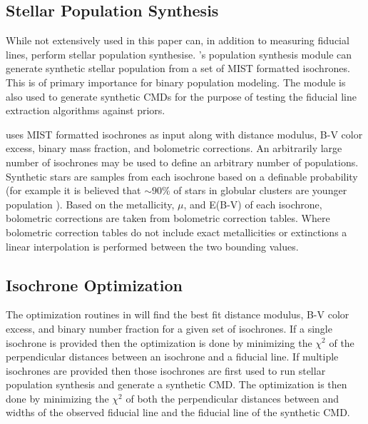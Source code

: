 \subsection{Stellar Population Synthesis}
While not extensively used in this paper \fidanka can, in addition to measuring fiducial
lines, perform stellar population synthesise. \fidanka's population synthesis
module can generate synthetic stellar population from a set of MIST formatted
isochrones. This is of primary importance for binary population modeling. The
module is also used to generate synthetic CMDs for the purpose of testing the
fiducial line extraction algorithms against priors.

\fidanka uses MIST formatted isochrones \citep{Dotter2016} as input along
with distance modulus, B-V color excess, binary mass fraction, and bolometric
corrections. An arbitrarily large number of isochrones may be used to define an
arbitrary number of populations. Synthetic stars are samples from each
isochrone based on a definable probability (for example it is believed that
$\sim90\%$ of stars in globular clusters are younger population
\citep[e.g.][]{Suntzeff1996, Carretta2013}). Based on the metallicity, $\mu$, and E(B-V) of each
isochrone, bolometric corrections are taken from bolometric correction tables.
Where bolometric correction tables do not include exact metallicities or
extinctions a linear interpolation is performed between the two bounding
values. 

\subsection{Isochrone Optimization}
The optimization routines in \fidanka will find the best fit distance modulus,
B-V color excess, and binary number fraction for a given set of isochrones. If
a single isochrone is provided then the optimization is done by minimizing the
$\chi^2$ of the perpendicular distances between an isochrone and a fiducial
line. If multiple isochrones are provided then those isochrones are first used
to run stellar population synthesis and generate a synthetic CMD. The
optimization is then done by minimizing the $\chi^2$ of both the perpendicular
distances between and widths of the observed fiducial line and the fiducial
line of the synthetic CMD.


